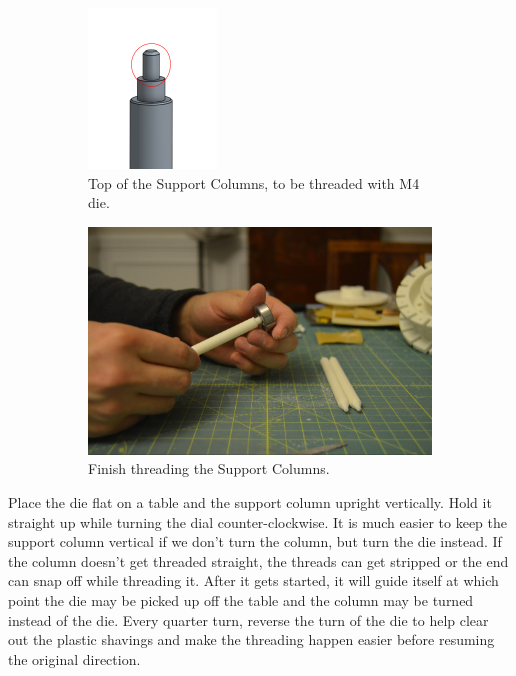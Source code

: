 \documentclass[openany]{book}
\begin{document}
\begin{figure}[!ht]
\begin{subfigure}{.4\textwidth}
	\centering
	\includegraphics{images/image14.png}
	\caption{Top of the Support Columns, to be threaded with M4 die.}
	\label{fig:image14}	
\end{subfigure}
\begin{subfigure}{.5\textwidth}
	\centering
	\includegraphics[width=.95\textwidth]{images/image41.jpg}
	\caption{Finish threading the Support Columns.}
	\label{fig:image41}	
\end{subfigure}
\caption{}
\end{figure}

Place the die flat on a table and the support column upright vertically. Hold it straight up while turning the dial counter-clockwise. It is much easier to keep the support column vertical if we don’t turn the column, but turn the die instead. If the column doesn’t get threaded straight, the threads can get stripped or the end can snap off while threading it. After it gets started, it will guide itself at which point the die may be picked up off the table and the column may be turned instead of the die. Every quarter turn, reverse the turn of the die to help clear out the plastic shavings and make the threading happen easier before resuming the original direction.
\end{document}
